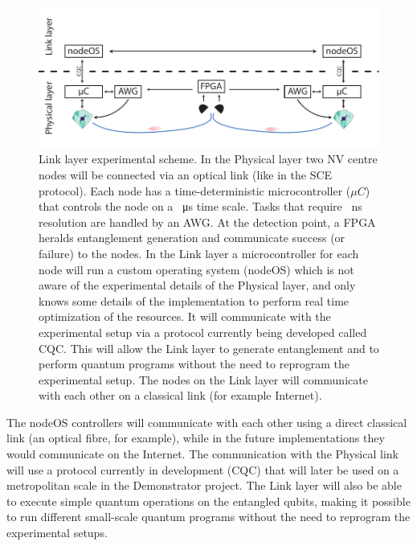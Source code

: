 \documentclass[a4paper]{article}
\begin{document}
\begin{figure}
	\includegraphics[width=\textwidth]{images/figure4}
	\caption{Link layer experimental scheme. 
		In the Physical layer two \ac{NV} centre nodes will be connected via an optical link (like in the \ac{SCE} protocol). Each node has a time-deterministic microcontroller ($\mu C$) that controls the node on a \SI{}{\micro s} time scale. Tasks that require \SI{}{\nano s} resolution are handled by an \acf{AWG}. At the detection point, a \acf{FPGA} heralds entanglement generation and communicate success (or failure) to the nodes.
		In the Link layer a microcontroller for each node will run a custom operating system (nodeOS) which is not aware of the experimental details of the Physical layer, and only knows some details of the  implementation to perform real time optimization of the resources. It will communicate with the experimental setup via a protocol currently being developed called \acf{CQC}. This will allow the Link layer to generate entanglement and to perform quantum programs without the need to reprogram the experimental setup. The nodes on the Link layer will communicate with each other on a classical link (for example Internet).
	}
	\label{fig:link_layer_experiment}
\end{figure}

The nodeOS controllers will communicate with each other using a direct classical link (an optical fibre, for example), while in the future implementations they would communicate on the Internet. The communication with the Physical link will use a protocol currently in development (\ac{CQC}) that will later be used on a metropolitan scale in the Demonstrator project.
The Link layer will also be able to execute simple quantum operations on the entangled qubits, making it possible to run different small-scale quantum programs without the need to reprogram the experimental setups.
\end{document}
